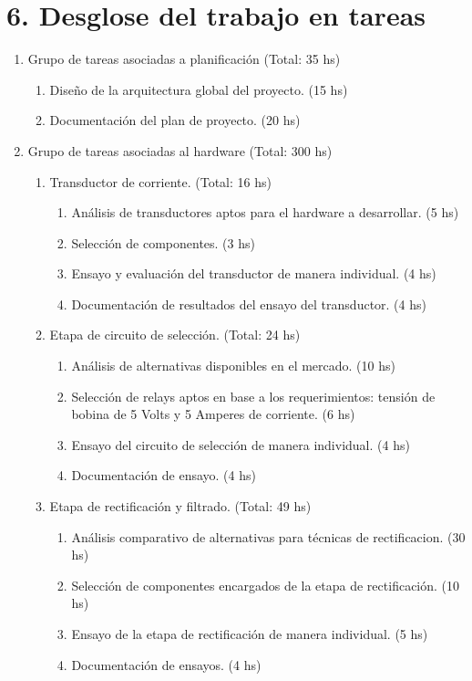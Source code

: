 \documentclass[11pt]{charter}
\begin{document}
\section{6. Desglose del trabajo en tareas}
\label{sec:wbs}
\begin{enumerate}
\item Grupo de tareas asociadas a planificación (Total: 35 hs)
	\begin{enumerate}
		\item Diseño de la arquitectura global del proyecto. (15 hs)
		\item Documentación del plan de proyecto. (20 hs)
	\end{enumerate}
\item Grupo de tareas asociadas al hardware (Total: 300 hs)
	\begin{enumerate}
		 \item Transductor de corriente. (Total: 16 hs)
			 \begin{enumerate}[label*=\arabic*.]
			 	\item Análisis de transductores aptos para el hardware a desarrollar. (5 hs)
			 	\item Selección de componentes. (3 hs)
			 	\item Ensayo y evaluación del transductor de manera individual. (4 hs)
			 	\item Documentación de resultados del ensayo del transductor. (4 hs)
			 \end{enumerate}
			
		 \item Etapa de circuito de selección. (Total: 24 hs)
			 \begin{enumerate}[label*=\arabic*.]
			 	\item Análisis de alternativas disponibles en el mercado. (10 hs)
			 	\item Selección de relays aptos en base a los requerimientos: tensión de bobina de 5 Volts y 5 Amperes de corriente. (6 hs)
			 	\item Ensayo del circuito de selección de manera individual. (4 hs)
			 	\item Documentación de ensayo. (4 hs)
			 \end{enumerate}			
			
		 \item Etapa de rectificación y filtrado. (Total: 49 hs)
			 \begin{enumerate}[label*=\arabic*.]
				\item Análisis comparativo de alternativas para técnicas de rectificacion. (30 hs)
				\item Selección de componentes encargados de la etapa de rectificación. (10 hs)
				\item Ensayo de la etapa de rectificación de manera individual. (5 hs)
				\item Documentación de ensayos. (4 hs)
			 \end{enumerate}
			

\end{enumerate}
\end{enumerate}
\end{document}
